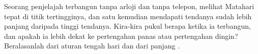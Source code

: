 \begin{exercise}[$\star\star$]\label{exo:g3:sun-days-seasons:11}
Seorang penjelajah terbangun tanpa arloji dan tanpa telepon, melihat
Matahari tepat di titik tertingginya, dan satu  kemudian mendapati
 tendanya sudah lebih panjang daripada tinggi tendanya.
Kira-kira pukul berapa ketika ia terbangun, dan apakah ia lebih dekat
ke pertengahan  panas atau pertengahan  dingin? Beralasanlah
dari aturan tengah hari dan dari panjang .
\end{exercise}
